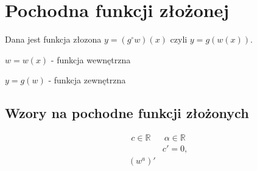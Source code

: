 \documentclass[11pt]{article}
\begin{document}
\section{Pochodna funkcji złożonej}
\label{sec:org8868872}
Dana jest funkcja złozona \(y = (g^\circ w)(x)\) czyli \(y = g(w(x))\).

\(w = w(x)\) - funkcja wewnętrzna

\(y = g(w)\) - funkcja zewnętrzna

\subsection{Wzory na pochodne funkcji złożonych}
\label{sec:org89f464c}
\begin{align*}
c \in \mathbb{R} && \alpha \in \mathbb{R}
\end{align*}
\begin{align*}
  & c' = 0,
  \\ \left(w^{a}\right)'
\end{align*}
\end{document}
